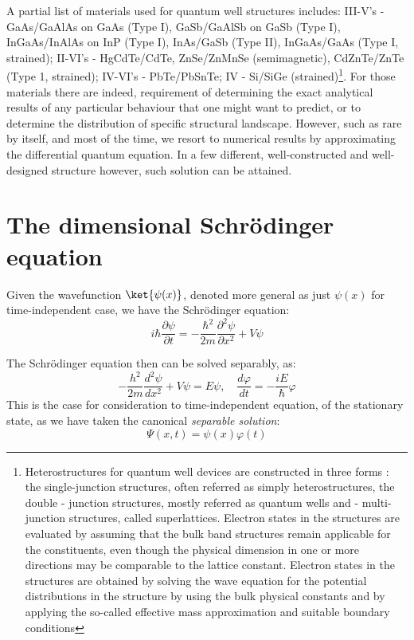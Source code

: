 A partial list of materials used for quantum well structures includes: III-V's - GaAs/GaAlAs on GaAs (Type I), GaSb/GaAlSb on GaSb (Type I), InGaAs/InAlAs on InP (Type I), InAs/GaSb (Type II), InGaAs/GaAs (Type I, strained); II-VI's - HgCdTe/CdTe, ZnSe/ZnMnSe (semimagnetic), CdZnTe/ZnTe (Type 1, strained); IV-VI's - PbTe/PbSnTe; IV - Si/SiGe (strained)\footnote{Heterostructures for quantum well devices are constructed in three forms : the single-junction structures, often referred as simply heterostructures, the double - junction structures, mostly referred as quantum wells and - multi-junction structures, called superlattices. Electron states in the structures are evaluated by assuming that the bulk band structures remain applicable for the constituents, even though the physical dimension in one or more directions may be comparable to the lattice constant. Electron states in the structures are obtained by solving the wave equation for the potential distributions in the structure by using the bulk physical constants and by applying the so-called effective mass approximation and suitable boundary conditions}. For those materials there are indeed, requirement of determining the exact analytical results of any particular behaviour that one might want to predict, or to determine the distribution of specific structural landscape. However, such as rare by itself, and most of the time, we resort to numerical results by approximating the differential quantum equation. In a few different, well-constructed and well-designed structure however, such solution can be attained. 

\section{The dimensional Schrödinger equation}
Given the wavefunction $\ket{\psi(x)}$, denoted more general as just $\psi(x)$ for time-independent case, we have the Schrödinger equation: 
\begin{equation}
  i\hbar \frac{\partial \psi}{\partial t} = -\frac{\hbar^{2}}{2m} \frac{\partial^{2}\psi}{\partial x^{2}}+V \psi
\end{equation}

The Schrödinger equation then can be solved separably, as: 
\begin{equation}
  -  \frac{h^{2}}{2m} \frac{d^{2}\psi}{dx^{2}} + V\psi = E\psi, \quad \frac{d\varphi}{dt}=-\frac{iE}{\hbar}\varphi
\end{equation}
This is the case for consideration to time-independent equation, of the stationary state, as we have taken the canonical \textit{separable solution}: 
\begin{equation}
  \Psi(x,t) = \psi(x)\varphi(t)
\end{equation}

